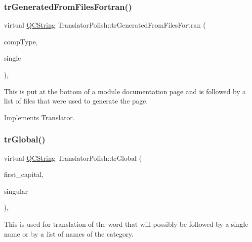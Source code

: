 \mbox{\label{class_translator_polish_aabe901b44e851e40a3fe0d7179a9cb79}} 
\subsubsection{\texorpdfstring{trGeneratedFromFilesFortran()}{trGeneratedFromFilesFortran()}}
{\footnotesize\ttfamily virtual \mbox{\hyperlink{class_q_c_string}{Q\+C\+String}} Translator\+Polish\+::tr\+Generated\+From\+Files\+Fortran (\begin{DoxyParamCaption}\item[{\mbox{\hyperlink{class_class_def_ae70cf86d35fe954a94c566fbcfc87939}{Class\+Def\+::\+Compound\+Type}}}]{comp\+Type,  }\item[{bool}]{single }\end{DoxyParamCaption})\hspace{0.3cm}{\ttfamily [inline]}, {\ttfamily [virtual]}}

This is put at the bottom of a module documentation page and is followed by a list of files that were used to generate the page. 

Implements \mbox{\hyperlink{class_translator}{Translator}}.

\mbox{\label{class_translator_polish_a62f2f17d8585f65081cc9fd3f5091f4f}} 
\subsubsection{\texorpdfstring{trGlobal()}{trGlobal()}}
{\footnotesize\ttfamily virtual \mbox{\hyperlink{class_q_c_string}{Q\+C\+String}} Translator\+Polish\+::tr\+Global (\begin{DoxyParamCaption}\item[{bool}]{first\+\_\+capital,  }\item[{bool}]{singular }\end{DoxyParamCaption})\hspace{0.3cm}{\ttfamily [inline]}, {\ttfamily [virtual]}}

This is used for translation of the word that will possibly be followed by a single name or by a list of names of the category. 

